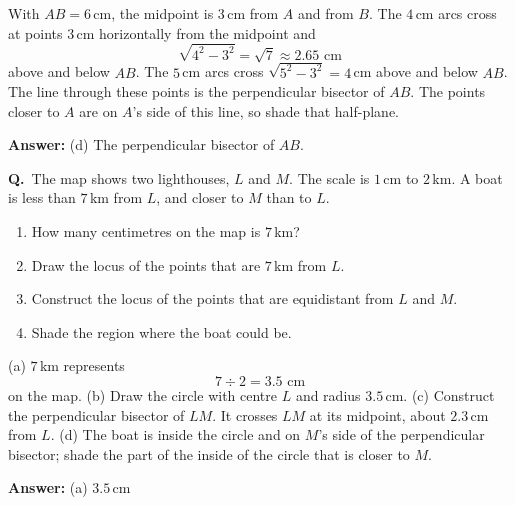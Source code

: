 \documentclass[12pt,a4paper]{article}
\newcounter{sol}
\newcommand{\s}{\refstepcounter{sol}\textbf{Q\thesol.}\ }
\newcommand{\ans}[1]{\par\smallskip\noindent\textbf{Answer:} #1\par}
\newcommand{\pt}[3]{\fill #1 circle (1.5pt); \node[inner sep=2pt,#2] at #1 {$#3$};}
\begin{document}
\begin{solbox}
With \(AB=6\)\,cm, the midpoint is \(3\)\,cm from \(A\) and from \(B\). The \(4\)\,cm arcs cross at points \(3\)\,cm horizontally from the midpoint and
\[
\sqrt{4^2-3^2}=\sqrt7\approx 2.65\text{ cm}
\]
above and below \(AB\). The \(5\)\,cm arcs cross \(\sqrt{5^2-3^2}=4\)\,cm above and below \(AB\). The line through these points is the perpendicular bisector of \(AB\). The points closer to \(A\) are on \(A\)'s side of this line, so shade that half-plane.
\end{solbox}
\ans{(d) The perpendicular bisector of \(AB\).}

\begin{center}
\end{center}

\newpage

\s The map shows two lighthouses, \(L\) and \(M\). The scale is \(1\)\,cm to \(2\)\,km. A boat is less than \(7\)\,km from \(L\), and closer to \(M\) than to \(L\).
\begin{enumerate}
  \item How many centimetres on the map is \(7\)\,km?
  \item Draw the locus of the points that are \(7\)\,km from \(L\).
  \item Construct the locus of the points that are equidistant from \(L\) and \(M\).
  \item Shade the region where the boat could be.
\end{enumerate}

\begin{solbox}
(a) \(7\)\,km represents
\[
7\div 2=3.5\text{ cm}
\]
on the map. (b) Draw the circle with centre \(L\) and radius \(3.5\)\,cm. (c) Construct the perpendicular bisector of \(LM\). It crosses \(LM\) at its midpoint, about \(2.3\)\,cm from \(L\). (d) The boat is inside the circle and on \(M\)'s side of the perpendicular bisector; shade the part of the inside of the circle that is closer to \(M\).
\end{solbox}
\ans{(a) \(3.5\)\,cm}
\end{document}
